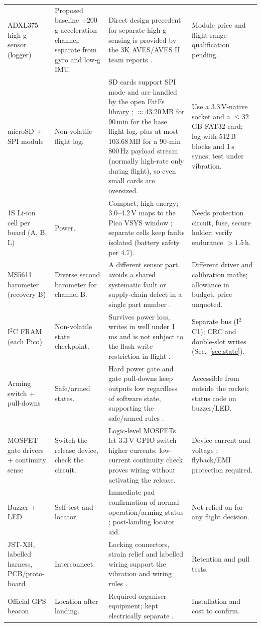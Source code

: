 \begin{longtable}{@{}L{23mm}L{30mm}L{60mm}L{37mm}@{}}
ADXL375 high-g sensor (logger) & Proposed baseline $\pm200$ g acceleration channel; separate from gyro and low-g IMU. & Direct design precedent for separate high-g sensing is provided by the 3K AVES/AVES II team reports \cite{astg2021aves,astg2022aves2,adxl375ds}. & Module price and flight-range qualification pending.\\
microSD + SPI module & Non-volatile flight log. & SD cards support SPI mode \cite{sdspec} and are handled by the open FatFs library \cite{fatfs}; $\approx$43.20\,MB for 90\,min for the base flight log, plus at most 103.68\,MB for a 90-min 800\,Hz payload stream (normally high-rate only during flight), so even small cards are oversized. & Use a 3.3\,V-native socket and a $\le$32\,GB FAT32 card; log with 512\,B blocks and 1\,s syncs; test under vibration.\\
1S Li-ion cell per board (A, B, L) & Power. & Compact, high energy; 3.0--4.2\,V maps to the Pico VSYS window \cite{picods}; separate cells keep faults isolated (battery safety per \cite{rtc2027app03} 4.7). & Needs protection circuit, fuse, secure holder; verify endurance $>1.5$\,h.\\
MS5611 barometer (recovery B) & Diverse second barometer for channel B. & A different sensor part avoids a shared systematic fault or supply-chain defect in a single part number \cite{ms5611ds,knight1986}. & Different driver and calibration maths; allowance in budget, price unquoted.\\
I$^2$C FRAM (each Pico) & Non-volatile state checkpoint. & Survives power loss, writes in well under 1\,ms and is not subject to the flash-write restriction in flight \cite{fram,rp2040ds}. & Separate bus (I$^2$C1); CRC and double-slot writes (Sec.~\ref{sec:state}).\\
Arming switch + pull-downs & Safe/armed states. & Hard power gate and gate pull-downs keep outputs low regardless of software state, supporting the safe/armed rules \cite{rtc2027app03}. & Accessible from outside the rocket; status code on buzzer/LED.\\
MOSFET gate drivers + continuity sense & Switch the release device, check the circuit. & Logic-level MOSFETs let 3.3\,V GPIO switch higher currents; low-current continuity check proves wiring without activating the release. & Device current and voltage ; flyback/EMI protection required.\\
Buzzer + LED & Self-test and locator. & Immediate pad confirmation of normal operation/arming status \cite{rtc2027app03}; post-landing locator aid. & Not relied on for any flight decision.\\
JST-XH, labelled harness, PCB/proto-board & Interconnect. & Locking connectors, strain relief and labelled wiring support the vibration and wiring rules \cite{rtc2027app03}. & Retention and pull tests.\\
Official GPS beacon & Location after landing. & Required organiser equipment; kept electrically separate \cite{rtc2027app03}. & Installation and cost to confirm.\\
\end{longtable}
\endgroup %
\normalsize

